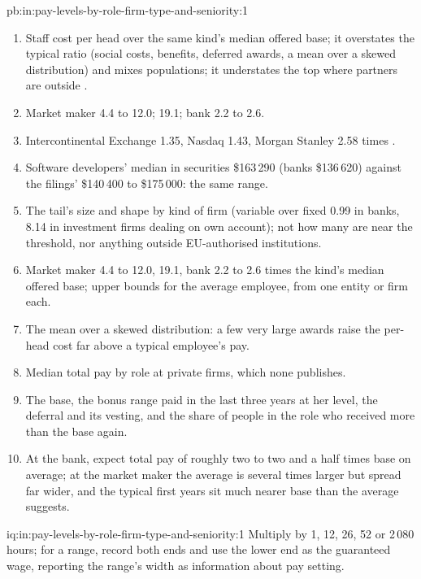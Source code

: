 \begin{solution}{pb:in:pay-levels-by-role-firm-type-and-seniority:1}
\begin{enumerate}
\$84\,800 to \$180\,000--185\,000 and then stays flat, because offers far above the floor are not ordered by it.
\item Staff cost per head over the same kind's median offered base; it overstates the typical ratio (social costs,
benefits, deferred awards, a mean over a skewed distribution) and mixes populations; it understates the top where
partners are outside .
\item Market maker 4.4 to 12.0;  19.1; bank 2.2 to 2.6.
\item Intercontinental Exchange 1.35, Nasdaq 1.43, Morgan Stanley 2.58 times .
\item Software developers' median in securities \$163\,290 (banks \$136\,620) against the filings' \$140\,400 to \$175\,000:
the same range.
\item The tail's size and shape by kind of firm (variable over fixed 0.99 in banks, 8.14 in investment firms dealing on
own account); not how many are near the threshold, nor anything outside EU-authorised institutions.
\item Market maker 4.4 to 12.0,  19.1, bank 2.2 to 2.6 times the kind's median offered base; upper
bounds for the average employee, from one entity or firm each.
\item The mean over a skewed distribution: a few very large awards raise the per-head cost far above a typical employee's
pay.
\item Median total pay by role at private firms, which none publishes.
\item The base, the bonus range paid in the last three years at her level, the deferral and its vesting, and the share of
people in the role who received more than the base again.
\item At the bank, expect total pay of roughly two to two and a half times base on average; at the market maker the
average is several times larger but spread far wider, and the typical first years sit much nearer base than the average
suggests.
\end{enumerate}
\end{solution}

\begin{solution}{iq:in:pay-levels-by-role-firm-type-and-seniority:1}
Multiply by 1, 12, 26, 52 or 2\,080 hours; for a range, record both ends and use the lower end as the guaranteed wage,
reporting the range's width as information about pay setting.
\end{solution}

